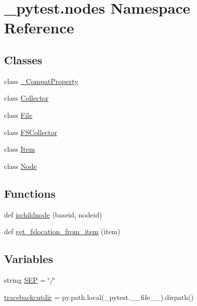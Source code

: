 \hypertarget{namespace__pytest_1_1nodes}{}\section{\+\_\+pytest.\+nodes Namespace Reference}
\label{namespace__pytest_1_1nodes}
\subsection*{Classes}
\begin{DoxyCompactItemize}
\item 
class \hyperlink{class__pytest_1_1nodes_1_1___compat_property}{\+\_\+\+Compat\+Property}
\item 
class \hyperlink{class__pytest_1_1nodes_1_1_collector}{Collector}
\item 
class \hyperlink{class__pytest_1_1nodes_1_1_file}{File}
\item 
class \hyperlink{class__pytest_1_1nodes_1_1_f_s_collector}{F\+S\+Collector}
\item 
class \hyperlink{class__pytest_1_1nodes_1_1_item}{Item}
\item 
class \hyperlink{class__pytest_1_1nodes_1_1_node}{Node}
\end{DoxyCompactItemize}
\subsection*{Functions}
\begin{DoxyCompactItemize}
\item 
def \hyperlink{namespace__pytest_1_1nodes_a2501f3fe735e1e64eab91f16214d7b0e}{ischildnode} (baseid, nodeid)
\item 
def \hyperlink{namespace__pytest_1_1nodes_ac6dc8c7424d5ce289282190c7b58fbe5}{get\+\_\+fslocation\+\_\+from\+\_\+item} (item)
\end{DoxyCompactItemize}
\subsection*{Variables}
\begin{DoxyCompactItemize}
\item 
string \hyperlink{namespace__pytest_1_1nodes_a8fae5009d6c6d1c154e378ad6e7af96d}{S\+EP} = \char`\"{}/\char`\"{}
\item 
\hyperlink{namespace__pytest_1_1nodes_abeecba510a599ffcbc83a7edcaa85d42}{tracebackcutdir} = py.\+path.\+local(\+\_\+pytest.\+\_\+\+\_\+file\+\_\+\+\_\+).dirpath()
\end{DoxyCompactItemize}


